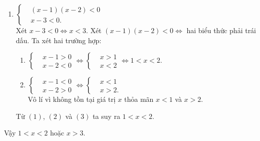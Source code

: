 \begin{bt}
{\begin{enumerate}
\begin{enumerate}[1)]
	\item $ \left\{\begin{aligned}&(x-1)(x-2)<0\\ &x-3<0.\end{aligned}\right.$\\
	Xét $ x-3<0 \Leftrightarrow x<3$.\noindent
	Xét $ (x-1)(x-2)<0\Leftrightarrow$ hai biểu thức phải trái dấu. Ta xét hai trường hợp:
	\begin{enumerate}[1)]
		\item $ \left\{\begin{aligned}&x-1>0\\ &x-2<0\end{aligned}\right.\Leftrightarrow \left\{\begin{aligned}&x>1\\ &x<2\end{aligned}\right.\Leftrightarrow 1<x<2 $.
		\item $ \left\{\begin{aligned}&x-1<0\\ &x-2>0\end{aligned}\right.\Leftrightarrow \left\{\begin{aligned}&x<1\\ &x>2.\end{aligned}\right.$\\
		Vô lí vì không tồn tại giá trị $ x $ thỏa mãn $ x<1 $ và $ x>2$.
	\end{enumerate}
Từ $ (1) $, $ (2) $ và $ (3) $ ta suy ra $ 1<x<2 $.
\end{enumerate}
Vậy $ 1<x<2 $ hoặc $ x>3 $.
\end{enumerate}
}
\end{bt}
